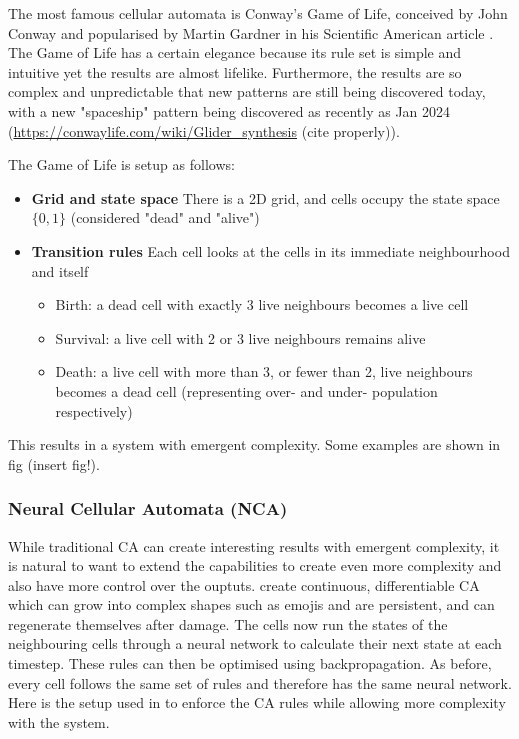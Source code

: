 \documentclass[12pt]{report}
\begin{document}
The most famous cellular automata is Conway's Game of Life, conceived by John Conway and popularised by Martin Gardner in his Scientific American article \citep{gardner1970ca}. The Game of Life has a certain elegance because its rule set is simple and intuitive yet the results are almost lifelike. Furthermore, the results are so complex and unpredictable that new patterns are still being discovered today, with a new "spaceship" pattern being discovered as recently as Jan 2024 (\url{https://conwaylife.com/wiki/Glider_synthesis} (cite properly)). 

The Game of Life is setup as follows: 

\begin{itemize}
    \item \textbf{Grid and state space} There is a 2D grid, and cells occupy the state space $\{0, 1\}$ (considered "dead" and "alive") 
    \item \textbf{Transition rules} Each cell looks at the cells in its immediate neighbourhood and itself
    \begin{itemize}
        \item Birth: a dead cell with exactly 3 live neighbours becomes a live cell
        \item Survival: a live cell with 2 or 3 live neighbours remains alive
        \item Death: a live cell with more than 3, or fewer than 2, live neighbours becomes a dead cell (representing over- and under- population respectively) 
    \end{itemize}
\end{itemize}

This results in a system with emergent complexity. Some examples are shown in fig (insert fig!). 

\subsubsection{Neural Cellular Automata (NCA)}

While traditional CA can create interesting results with emergent complexity, it is natural to want to extend the capabilities to create even more complexity and also have more control over the ouptuts. \cite{mordvintsev2020growing} create continuous, differentiable CA which can grow into complex shapes such as emojis and are persistent, and can regenerate themselves after damage. The cells now run the states of the neighbouring cells through a neural network to calculate their next state at each timestep. These rules can then be optimised using backpropagation. As before, every cell follows the same set of rules and therefore has the same neural network. Here is the setup used in \cite{mordvintsev2020growing} to enforce the CA rules while allowing more complexity with the system. 
\end{document}
